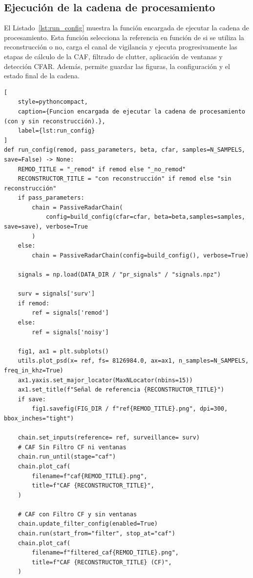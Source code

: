 \subsection{Ejecución de la cadena de procesamiento}
El Listado~\ref{lst:run_config} muestra la función encargada de ejecutar la cadena de procesamiento. Esta función selecciona la referencia en función de si se utiliza la reconstrucción o no, carga el canal de vigilancia y ejecuta progresivamente las etapas de cálculo de la CAF, filtrado de clutter, aplicación de ventanas y detección CFAR. Además, permite guardar las figuras, la configuración y el estado final de la cadena.\\\vspace{5pt}

\begin{lstlisting}[
    style=pythoncompact,
    caption={Funcion encargada de ejecutar la cadena de procesamiento (con y sin reconstrucción).},
    label={lst:run_config}
]
def run_config(remod, pass_parameters, beta, cfar, samples=N_SAMPELS, save=False) -> None:
    REMOD_TITLE = "_remod" if remod else "_no_remod"
    RECONSTRUCTOR_TITLE = "con reconstrucción" if remod else "sin reconstrucción"
    if pass_parameters:
        chain = PassiveRadarChain(
            config=build_config(cfar=cfar, beta=beta,samples=samples, save=save), verbose=True
        )
    else:
        chain = PassiveRadarChain(config=build_config(), verbose=True)

    signals = np.load(DATA_DIR / "pr_signals" / "signals.npz")
    
    surv = signals['surv']
    if remod:
        ref = signals['remod']
    else:
        ref = signals['noisy']

    fig1, ax1 = plt.subplots()
    utils.plot_psd(x= ref, fs= 8126984.0, ax=ax1, n_samples=N_SAMPELS, freq_in_khz=True)
    ax1.yaxis.set_major_locator(MaxNLocator(nbins=15))
    ax1.set_title(f"Señal de referencia {RECONSTRUCTOR_TITLE}")
    if save:
        fig1.savefig(FIG_DIR / f"ref{REMOD_TITLE}.png", dpi=300, bbox_inches="tight")
        
    chain.set_inputs(reference= ref, surveillance= surv)
    # CAF Sin Filtro CF ni ventanas
    chain.run_until(stage="caf")
    chain.plot_caf(
        filename=f"caf{REMOD_TITLE}.png",
        title=f"CAF {RECONSTRUCTOR_TITLE}",
    )

    # CAF con Filtro CF y sin ventanas
    chain.update_filter_config(enabled=True)
    chain.run(start_from="filter", stop_at="caf")
    chain.plot_caf(
        filename=f"filtered_caf{REMOD_TITLE}.png",
        title=f"CAF {RECONSTRUCTOR_TITLE} (CF)",
    )


\end{lstlisting}
